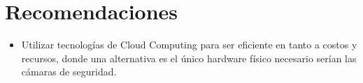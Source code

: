 \chapter{Recomendaciones}
\begin{itemize}
    \item Utilizar tecnologías de Cloud Computing para ser eficiente en tanto a costos y recursos, donde una alternativa es el único hardware físico necesario serían las cámaras de seguridad. 
\end{itemize}